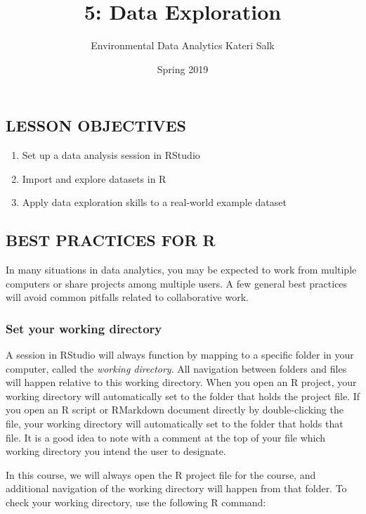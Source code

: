 \documentclass[]{article}
\title{5: Data Exploration}
\author{Environmental Data Analytics \textbar{} Kateri Salk}
\date{Spring 2019}
\providecommand{\tightlist}{%
  \setlength{\itemsep}{0pt}\setlength{\parskip}{0pt}}
\begin{document}
\maketitle

\subsection{LESSON OBJECTIVES}\label{lesson-objectives}

\begin{enumerate}
\def\labelenumi{\arabic{enumi}.}
\tightlist
\item
  Set up a data analysis session in RStudio
\item
  Import and explore datasets in R
\item
  Apply data exploration skills to a real-world example dataset
\end{enumerate}

\subsection{BEST PRACTICES FOR R}\label{best-practices-for-r}

In many situations in data analytics, you may be expected to work from
multiple computers or share projects among multiple users. A few general
best practices will avoid common pitfalls related to collaborative work.

\subsubsection{Set your working
directory}\label{set-your-working-directory}

A session in RStudio will always function by mapping to a specific
folder in your computer, called the \emph{working directory}. All
navigation between folders and files will happen relative to this
working directory. When you open an R project, your working directory
will automatically set to the folder that holds the project file. If you
open an R script or RMarkdown document directly by double-clicking the
file, your working directory will automatically set to the folder that
holds that file. It is a good idea to note with a comment at the top of
your file which working directory you intend the user to designate.

In this course, we will always open the R project file for the course,
and additional navigation of the working directory will happen from that
folder. To check your working directory, use the following R command:
\end{document}
